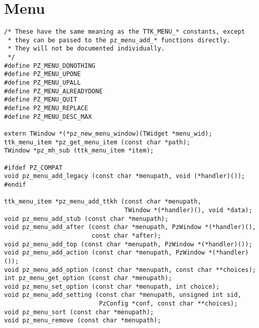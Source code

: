 \documentclass[12pt,letterpaper]{report}
\begin{document}
\section{Menu}
\begin{verbatim}
/* These have the same meaning as the TTK_MENU_* constants, except
 * they can be passed to the pz_menu_add_* functions directly.
 * They will not be documented individually.
 */
#define PZ_MENU_DONOTHING
#define PZ_MENU_UPONE
#define PZ_MENU_UPALL
#define PZ_MENU_ALREADYDONE
#define PZ_MENU_QUIT
#define PZ_MENU_REPLACE
#define PZ_MENU_DESC_MAX

extern TWindow *(*pz_new_menu_window)(TWidget *menu_wid);
ttk_menu_item *pz_get_menu_item (const char *path);
TWindow *pz_mh_sub (ttk_menu_item *item);

#ifdef PZ_COMPAT
void pz_menu_add_legacy (const char *menupath, void (*handler)());
#endif

ttk_menu_item *pz_menu_add_ttkh (const char *menupath,
                                 TWindow *(*handler)(), void *data);
void pz_menu_add_stub (const char *menupath);
void pz_menu_add_after (const char *menupath, PzWindow *(*handler)(),
                        const char *after);
void pz_menu_add_top (const char *menupath, PzWindow *(*handler)());
void pz_menu_add_action (const char *menupath, PzWindow *(*handler)());
void pz_menu_add_option (const char *menupath, const char **choices);
int pz_menu_get_option (const char *menupath);
void pz_menu_set_option (const char *menupath, int choice);
void pz_menu_add_setting (const char *menupath, unsigned int sid,
                          PzConfig *conf, const char **choices);
void pz_menu_sort (const char *menupath);
void pz_menu_remove (const char *menupath);
\end{verbatim}
\end{document}
